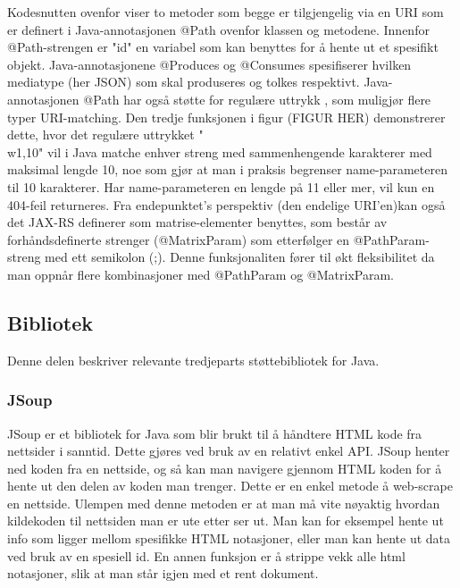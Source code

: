 \documentclass[../main.tex]{subfiles}
\begin{document}
Kodesnutten ovenfor viser to metoder som begge er tilgjengelig via en URI som er definert i Java-annotasjonen @Path ovenfor klassen og metodene. Innenfor @Path-strengen er "{id}" en variabel som kan benyttes for å hente ut et spesifikt objekt. Java-annotasjonene @Produces og @Consumes spesifiserer hvilken mediatype (her JSON) som skal produseres og tolkes respektivt.
Java-annotasjonen @Path har også støtte for regulære uttrykk , som muligjør flere typer URI-matching. Den tredje funksjonen i figur (FIGUR HER) demonstrerer dette, hvor det regulære uttrykket "\\w{1,10}" vil i Java matche enhver streng med sammenhengende karakterer med maksimal lengde 10, noe som gjør at man i praksis begrenser {name}-parameteren til 10 karakterer. Har {name}-parameteren en lengde på 11 eller mer, vil kun en 404-feil returneres.\newline
Fra endepunktet’s perspektiv (den endelige URI’en)kan også det JAX-RS definerer som matrise-elementer benyttes, som består av forhåndsdefinerte strenger (@MatrixParam) som etterfølger en @PathParam-streng med ett semikolon (;). Denne funksjonaliten fører til økt fleksibilitet da man oppnår flere kombinasjoner med @PathParam og @MatrixParam.

\subsection{Bibliotek}

Denne delen beskriver relevante tredjeparts støttebibliotek for Java.

\subsubsection{JSoup}

JSoup er et bibliotek for Java som blir brukt til å håndtere HTML kode fra nettsider i sanntid. Dette gjøres ved bruk av en relativt enkel API. JSoup henter ned koden fra en nettside, og så kan man navigere gjennom HTML koden for å hente ut den delen av koden man trenger.  Dette er en enkel metode å web-scrape en nettside. Ulempen med denne metoden er at man må vite nøyaktig hvordan kildekoden til nettsiden man er ute etter ser ut. Man kan for eksempel hente ut info som ligger mellom spesifikke HTML notasjoner, eller man kan hente ut data ved bruk av en spesiell id. En annen funksjon er å strippe vekk alle html notasjoner, slik at man står igjen med et rent dokument. 
\end{document}
